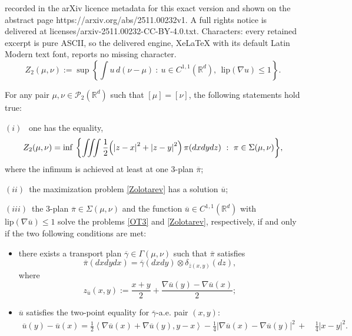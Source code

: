 \documentclass[10pt,a4paper]{amsart}
\newcommand{\Lip}{{\mathrm{lip}}}
\newcommand{\Rd}{{\R^d}}
\newcommand{\R}{\mathbb{R}}
\newcommand{\abs}[1]{{\left \lvert #1 \right \rvert}}
\newcommand{\med}{\medskip\noindent}
\newcommand{\ov}{\overline}
\newcommand{\pairing}[1]{{\left \langle #1 \right \rangle}}
\begin{document}
recorded in the arXiv licence metadata for this exact version and shown on the abstract page https://arxiv.org/abs/2511.00232v1. A full rights notice is delivered at licenses/arxiv-2511.00232-CC-BY-4.0.txt. Characters: every retained excerpt is pure ASCII, so the delivered engine, XeLaTeX with its default Latin Modern text font, reports no missing character.
\begin{equation}
\label{Zolotarev}
Z_2(\mu,\nu):= \sup\left\{  \int u \, d(\nu-\mu) \ :\  u\in C^{1,1}(\R^d),\ \  \Lip(\nabla u)\le 1\right\}.
\end{equation}

\begin{theorem}
    \label{BoBo}
    For any pair $\mu,\nu \in \mathcal{P}_2(\Rd)$ such that $[\mu] = [\nu]$, the following statements hold true:
    
  \noindent $(i)$ \  one has the equality,
        \begin{equation}\label{OT3}
            Z_2(\mu,\nu) =  \inf\ 
            \biggl\{  \iiint \frac{1}{2} \Bigl( \abs{z-x}^2 + \abs{z-y}^2 \Bigr) \, \pi(dxdydz)  \ :   \ \pi\in \Sigma(\mu,\nu)\biggr\},
        \end{equation} 
        where the infimum  is achieved   at least at one 3-plan  $\ov{\pi}$;
        
    \med
    $(ii)$\  the maximization problem \eqref{Zolotarev} has a solution $\ov{u}$;
       
       \med
       $(iii)$\ the 3-plan $\ov{\pi} \in \Sigma(\mu,\nu)$ and the function $\ov{u} \in C^{1,1}(\Rd)$ with $\mathrm{lip}(\nabla \ov{u}) \leq 1$ solve the problems  \eqref{OT3} and \eqref{Zolotarev}, respectively, if and only if the two following conditions are met:
        \begin{itemize}%
            \item there exists a  transport plan $\ov\gamma \in \Gamma(\mu,\nu)$ such that $\ov{\pi}$ satisfies 
             \begin{equation}
             	\label{disintegrated}
                \ov\pi(dxdydx) = \ov\gamma(dxdy) \otimes \delta_{\ov{z}(x,y)}(dz),
            \end{equation}
            where
            \begin{equation}
                 z_{\ov u}(x,y) := \frac{x+y}{2} + \frac{\nabla \ov u(y)-\nabla \ov u(x)}{2};
            \end{equation}
            \item $\ov u$ satisfies the  two-point equality  for $\ov\gamma$-a.e. pair $(x,y)$:
            \begin{align}\label{2-eq}
            \ov{u}(y)-\ov{u}(x) = \frac{1}{2} \pairing{\nabla \ov{u}(x) + \nabla \ov{u}(y), y-x} - \frac{1}{4} |\nabla \ov{u}(x) - \nabla \ov{u}(y)|^2 \, + \, & \frac{1}{4} \abs{x-y}^2 .
                   \end{align}
        \end{itemize}
\end{theorem}
\end{document}
